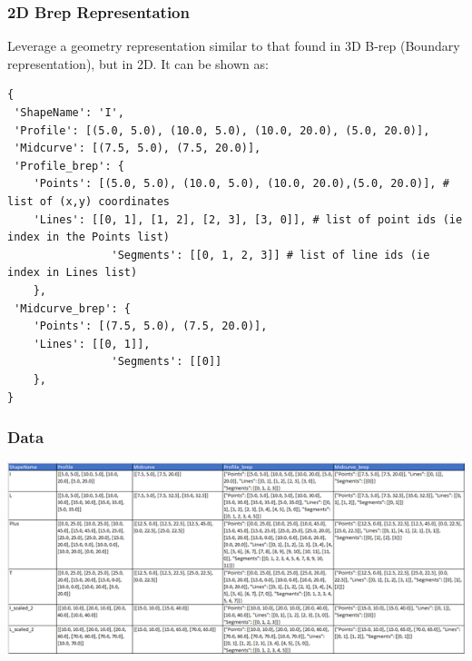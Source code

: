 
\begin{frame}[fragile]\frametitle{2D Brep Representation}

Leverage a geometry representation similar to that found in 3D B-rep (Boundary representation), but in 2D. It can be shown as:

\begin{lstlisting}
{
 'ShapeName': 'I',
 'Profile': [(5.0, 5.0), (10.0, 5.0), (10.0, 20.0), (5.0, 20.0)],
 'Midcurve': [(7.5, 5.0), (7.5, 20.0)],
 'Profile_brep': {
    'Points': [(5.0, 5.0), (10.0, 5.0), (10.0, 20.0),(5.0, 20.0)], # list of (x,y) coordinates
    'Lines': [[0, 1], [1, 2], [2, 3], [3, 0]], # list of point ids (ie index in the Points list)
                'Segments': [[0, 1, 2, 3]] # list of line ids (ie index in Lines list)
    },
 'Midcurve_brep': {
    'Points': [(7.5, 5.0), (7.5, 20.0)],
    'Lines': [[0, 1]],
                'Segments': [[0]]
    },    
}
\end{lstlisting}	
\end{frame}

\begin{frame}[fragile]\frametitle{Data}

         \begin{center}
	\includegraphics[width=\linewidth]{images/shapes_csv}
	\label{fig_csv}
    \end{center}
	
\end{frame}




